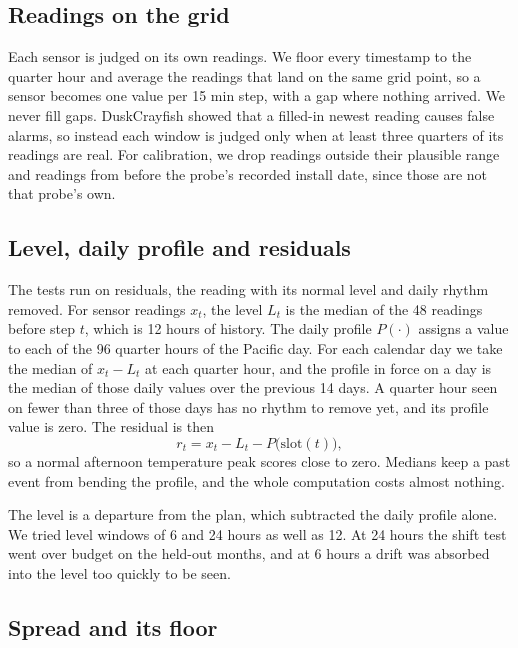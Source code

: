 \documentclass{article}
\begin{document}
\subsection{Readings on the grid}
\label{sec:grid}

Each sensor is judged on its own readings. We floor every timestamp to the
quarter hour and average the readings that land on the same grid point, so a
sensor becomes one value per 15 min step, with a gap where nothing arrived. We
never fill gaps. DuskCrayfish showed that a filled-in newest reading causes
false alarms, so instead each window is judged only when at least three
quarters of its readings are real. For calibration, we drop readings outside
their plausible range and readings from before the probe's recorded install
date, since those are not that probe's own.

\subsection{Level, daily profile and residuals}
\label{sec:residuals}

The tests run on residuals, the reading with its normal level and daily rhythm
removed. For sensor readings $x_t$, the level $L_t$ is the median of the 48
readings before step $t$, which is 12 hours of history. The daily profile
$P(\cdot)$ assigns a value to each of the 96 quarter hours of the Pacific day.
For each calendar day we take the median of $x_t - L_t$ at each quarter hour,
and the profile in force on a day is the median of those daily values over the
previous 14 days. A quarter hour seen on fewer than three of those days has no
rhythm to remove yet, and its profile value is zero. The residual is then
\begin{equation}
  r_{t} = x_{t} - L_{t} - P\big(\mathrm{slot}(t)\big),
\end{equation}
so a normal afternoon temperature peak scores close to zero. Medians keep a
past event from bending the profile, and the whole computation costs almost
nothing.

The level is a departure from the plan, which subtracted the daily profile
alone. We tried level windows of 6 and 24 hours as well as 12. At 24 hours the
shift test went over budget on the held-out months, and at 6 hours a drift was
absorbed into the level too quickly to be seen.

\subsection{Spread and its floor}
\label{sec:spread}
\end{document}
